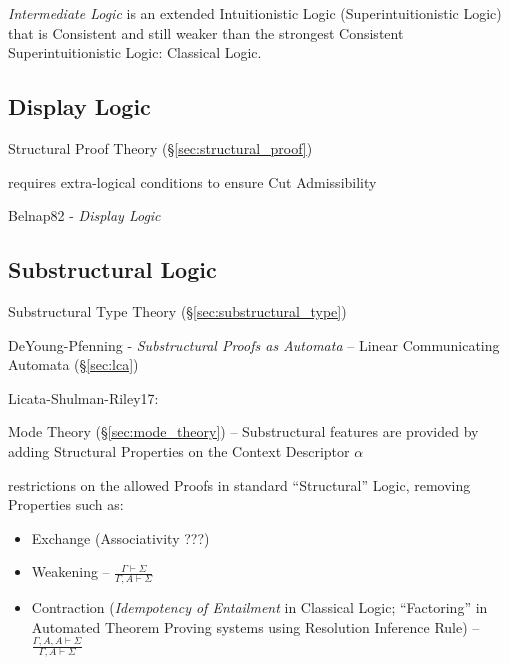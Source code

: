 \emph{Intermediate Logic} is an extended Intuitionistic Logic
(Superintuitionistic Logic) that is Consistent and still weaker than
the strongest Consistent Superintuitionistic Logic: Classical Logic.



\subsection{Display Logic}\label{sec:display_logic}

\fist Structural Proof Theory (\S\ref{sec:structural_proof})

requires extra-logical conditions to ensure Cut Admissibility

Belnap82 - \emph{Display Logic}



\subsection{Substructural Logic}\label{sec:substructural_logic}

Substructural Type Theory (\S\ref{sec:substructural_type})

DeYoung-Pfenning - \emph{Substructural Proofs as Automata}
-- Linear Communicating Automata (\S\ref{sec:lca})

Licata-Shulman-Riley17:

\fist Mode Theory (\S\ref{sec:mode_theory}) -- Substructural features
are provided by adding Structural Properties on the Context Descriptor
$\alpha$

restrictions on the allowed Proofs in standard ``Structural'' Logic,
removing Properties such as:
\begin{itemize}
  \item Exchange (Associativity ???) %
  \item Weakening -- $\frac{\Gamma \vdash \Sigma}
    {\Gamma,A \vdash \Sigma}$
  \item Contraction (\emph{Idempotency of Entailment} in Classical
    Logic; ``Factoring'' in Automated Theorem Proving systems using
    Resolution Inference Rule) -- $\frac{\Gamma,A,A \vdash \Sigma}
    {\Gamma,A \vdash \Sigma}$
\end{itemize}

